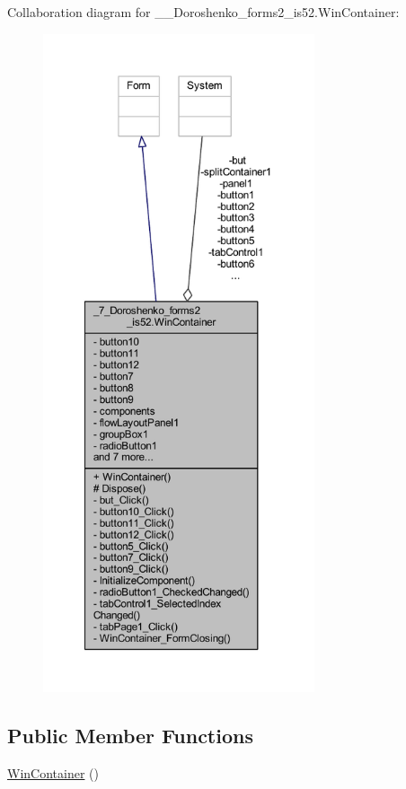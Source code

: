 Collaboration diagram for \+\_\+\_\+\+Doroshenko\+\_\+forms2\+\_\+is52.\+Win\+Container\+:
\nopagebreak
\begin{figure}[H]
\begin{center}
\leavevmode
\includegraphics[height=550pt]{class__7___doroshenko__forms2__is52_1_1_win_container__coll__graph}
\end{center}
\end{figure}
\subsection*{Public Member Functions}
\begin{DoxyCompactItemize}
\item 
\hyperlink{class__7___doroshenko__forms2__is52_1_1_win_container_a43e1e879487706ee2d3fdf336598b566}{Win\+Container} ()
\end{DoxyCompactItemize}
